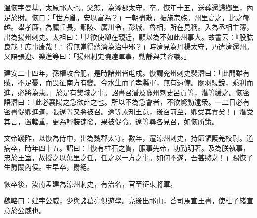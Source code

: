 
\begin{pinyinscope}
溫恢字曼基，太原祁人也。父恕，為涿郡太守，卒。恢年十五，送葬還歸鄉里，內足於財。恢曰：「世方亂，安以富為？」一朝盡散，振施宗族。州里高之，比之郇越。舉孝廉，為廩丘長，鄢陵、廣川令，彭城、魯相，所在見稱。入為丞相主簿，出為揚州刺史。太祖曰：「甚欲使卿在親近，顧以為不如此州事大。故書云：『股肱良哉！庶事康哉！』得無當得蔣濟為治中邪？」時濟見為丹楊太守，乃遣濟還州。又語張遼、樂進等曰：「揚州刺史曉達軍事，動靜與共咨議。」

建安二十四年，孫權攻合肥，是時諸州皆屯戍。恢謂兖州刺史裴潛曰：「此閒雖有賊，不足憂，而畏征南方有變。今水生而子孝縣軍，無有遠備。關羽驍銳，乘利而進，必將為患。」於是有樊城之事。詔書召潛及豫州刺史呂貢等，潛等緩之。恢密語潛曰：「此必襄陽之急欲赴之也。所以不為急會者，不欲驚動遠衆。一二日必有密書促卿進道，張遼等又將被召。遼等素知王意，後召前至，卿受其責矣！」潛受其言，置輜重，更為輕裝速發，果被促令。遼等尋各見召，如恢所策。

文帝踐阼，以恢為侍中，出為魏郡太守。數年，遷涼州刺史，持節領護羌校尉。道病卒，時年四十五。詔曰：「恢有柱石之質，服事先帝，功勤明著。及為朕執事，忠於王室，故授之以萬里之任，任之以一方之事。如何不遂，吾甚愍之！」賜恢子生爵關內侯。生早卒，爵絕。

恢卒後，汝南孟建為涼州刺史，有治名，官至征東將軍。

魏略曰：建字公威，少與諸葛亮俱遊學。亮後出祁山，荅司馬宣王書，使杜子緒宣意於公威也。


\end{pinyinscope}